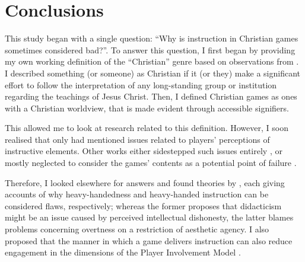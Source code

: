 \chapter{Conclusions} \label{ch:conclusions}


This study began with a single question: ``Why is instruction in Christian games sometimes considered bad?''. To answer this question, I first began by providing my own working definition of the ``Christian'' genre based on observations from \textcite{gonzalez_born-again_2014, schut_swords_2026}. I described something (or someone) as Christian if it (or they) make a significant effort to follow the interpretation of any long-standing group or institution regarding the teachings of Jesus Christ. Then, I defined Christian games as ones with a Christian worldview, that is made evident through accessible signifiers. 

This allowed me to look at research related to this definition. However, I soon realised that only \textcite{schut_making_2013} had mentioned issues related to players' perceptions of instructive elements. Other works either sidestepped such issues entirely \parencite{gonzalez_born-again_2014}, or mostly neglected to consider the games' contents as a potential point of failure \parencite{schut_swords_2026, bernauer_playing_2012}. 

Therefore, I looked elsewhere for answers and found theories by \textcite{king_virtue_2017, repp_whats_2012}, each giving accounts of why heavy-handedness and heavy-handed instruction can be considered flaws, respectively; whereas the former proposes that didacticism might be an issue caused by perceived intellectual dishonesty, the latter blames problems concerning overtness on a restriction of aesthetic agency. I also proposed that the manner in which a game delivers instruction can also reduce engagement in the dimensions of the Player Involvement Model \parencite{calleja_in_game_2011}.

